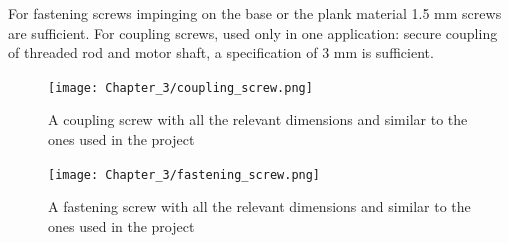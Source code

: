 For fastening screws impinging on the base or the plank material 1.5 mm screws are sufficient. For coupling screws, used only in one application: secure coupling of threaded rod and motor shaft, a specification of 3 mm is sufficient.

\begin{figure}[h]
 \centering
 \texttt{[image: Chapter\_3/coupling\_screw.png]}
 \caption{A coupling screw with all the relevant dimensions and similar to the ones used in the project}
 \label{fig:cscrew}
\end{figure}

\begin{figure}[h]
 \centering
 \texttt{[image: Chapter\_3/fastening\_screw.png]}
 \caption{A fastening screw with all the relevant dimensions and similar to the ones used in the project}
 \label{fig:fscrew}
\end{figure}
